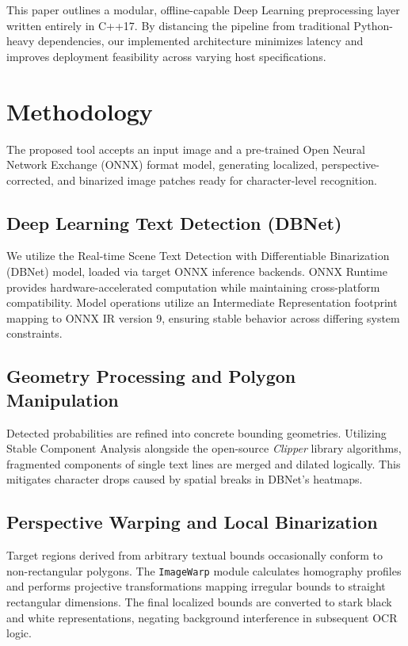 \documentclass[conference]{IEEEtran}
\begin{document}
This paper outlines a modular, offline-capable Deep Learning preprocessing layer written entirely in C++17. By distancing the pipeline from traditional Python-heavy dependencies, our implemented architecture minimizes latency and improves deployment feasibility across varying host specifications. 

\section{Methodology}
The proposed tool accepts an input image and a pre-trained Open Neural Network Exchange (ONNX) format model, generating localized, perspective-corrected, and binarized image patches ready for character-level recognition.

\subsection{Deep Learning Text Detection (DBNet)}
We utilize the Real-time Scene Text Detection with Differentiable Binarization (DBNet) model, loaded via target ONNX inference backends. ONNX Runtime provides hardware-accelerated computation while maintaining cross-platform compatibility. Model operations utilize an Intermediate Representation footprint mapping to ONNX IR version 9, ensuring stable behavior across differing system constraints.

\subsection{Geometry Processing and Polygon Manipulation}
Detected probabilities are refined into concrete bounding geometries. Utilizing Stable Component Analysis alongside the open-source \textit{Clipper} library algorithms, fragmented components of single text lines are merged and dilated logically. This mitigates character drops caused by spatial breaks in DBNet's heatmaps.

\subsection{Perspective Warping and Local Binarization}
Target regions derived from arbitrary textual bounds occasionally conform to non-rectangular polygons. The \texttt{ImageWarp} module calculates homography profiles and performs projective transformations mapping irregular bounds to straight rectangular dimensions. The final localized bounds are converted to stark black and white representations, negating background interference in subsequent OCR logic.
\end{document}
